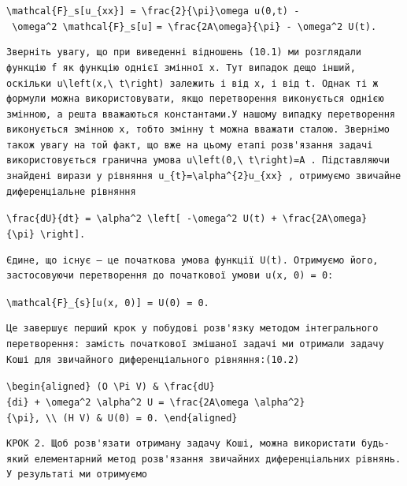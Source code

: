 \documentclass[
  ukrainian,
]{article}
\begin{document}
\texttt{\textbackslash{}mathcal\{F\}\_s{[}u\_\{xx\}{]}\ =\ \textbackslash{}frac\{2\}\{\textbackslash{}pi\}\textbackslash{}omega\ u(0,t)\ -\ \textbackslash{}omega\^{}2\ \textbackslash{}mathcal\{F\}\_s{[}u{]}}
\texttt{=\ \textbackslash{}frac\{2A\textbackslash{}omega\}\{\textbackslash{}pi\}\ -\ \textbackslash{}omega\^{}2\ U(t).}

\begin{verbatim}
Зверніть увагу, що при виведенні відношень (10.1) ми розглядали функцію f як функцію однієї змінної x. Тут випадок дещо інший, оскільки u\left(x,\ t\right) залежить і від x, і від t. Однак ті ж формули можна використовувати, якщо перетворення виконується однією змінною, а решта вважаються константами.У нашому випадку перетворення виконується змінною x, тобто змінну t можна вважати сталою. Звернімо також увагу на той факт, що вже на цьому етапі розв'язання задачі використовується гранична умова u\left(0,\ t\right)=A . Підставляючи знайдені вирази у рівняння u_{t}=\alpha^{2}u_{xx} , отримуємо звичайне диференціальне рівняння
\end{verbatim}

\texttt{\textbackslash{}frac\{dU\}\{dt\}\ =\ \textbackslash{}alpha\^{}2\ \textbackslash{}left{[}\ -\textbackslash{}omega\^{}2\ U(t)\ +\ \textbackslash{}frac\{2A\textbackslash{}omega\}\{\textbackslash{}pi\}\ \textbackslash{}right{]}.}

\begin{verbatim}
Єдине, що існує — це початкова умова функції U(t). Отримуємо його, застосовуючи перетворення до початкової умови u(x, 0) = 0:
\end{verbatim}

\texttt{\textbackslash{}mathcal\{F\}\_\{s\}{[}u(x,\ 0){]}\ =\ U(0)\ =\ 0.}

\begin{verbatim}
Це завершує перший крок у побудові розв'язку методом інтегрального перетворення: замість початкової змішаної задачі ми отримали задачу Коші для звичайного диференціального рівняння:(10.2)
\end{verbatim}

\texttt{\textbackslash{}begin\{aligned\}\ (O\ \textbackslash{}Pi\ V)\ \&\ \textbackslash{}frac\{dU\}\{di\}\ +\ \textbackslash{}omega\^{}2\ \textbackslash{}alpha\^{}2\ U\ =\ \textbackslash{}frac\{2A\textbackslash{}omega\ \textbackslash{}alpha\^{}2\}\{\textbackslash{}pi\},\ \textbackslash{}\textbackslash{}\ (H\ V)\ \&\ U(0)\ =\ 0.\ \textbackslash{}end\{aligned\}}

\begin{verbatim}
КРОК 2. Щоб розв'язати отриману задачу Коші, можна використати будь-який елементарний метод розв'язання звичайних диференціальних рівнянь. У результаті ми отримуємо
\end{verbatim}
\end{document}
